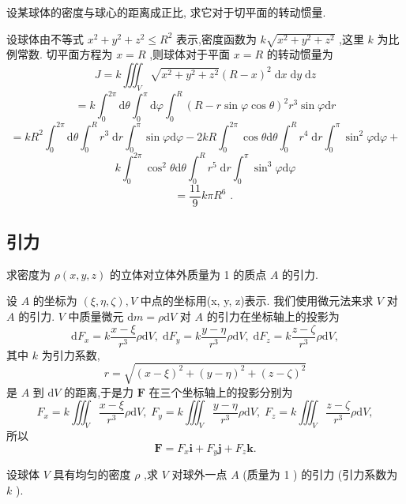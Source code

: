 \begin{example}

\end{example}
设某球体的密度与球心的距离成正比, 求它对于切平面的转动惯量.

\begin{solution}

\end{solution}
设球体由不等式 \({x}^{2} + {y}^{2} + {z}^{2} \leq  {R}^{2}\) 表示,密度函数为 \(k\sqrt{{x}^{2} + {y}^{2} + {z}^{2}}\) ,这里 \(k\) 为比例常数. 切平面方程为 \(x = R\) ,则球体对于平面 \(x = R\) 的转动惯量为
\[
J = k{\iiint }_{V}\sqrt{{x}^{2} + {y}^{2} + {z}^{2}}{\left( R - x\right) }^{2}\mathrm{\;d}x\mathrm{\;d}y\mathrm{\;d}z
\]
\[
= k{\int }_{0}^{2\pi }\mathrm{d}\theta {\int }_{0}^{\pi }\mathrm{d}\varphi {\int }_{0}^{R}{\left( R - r\sin \varphi \cos \theta \right) }^{2}{r}^{3}\sin \varphi \mathrm{d}r
\]
\[
= k{R}^{2}{\int }_{0}^{2\pi }\mathrm{d}\theta {\int }_{0}^{R}{r}^{3}\mathrm{\;d}r{\int }_{0}^{\pi }\sin \varphi \mathrm{d}\varphi  - {2kR}{\int }_{0}^{2\pi }\cos \theta \mathrm{d}\theta {\int }_{0}^{R}{r}^{4}\mathrm{\;d}r{\int }_{0}^{\pi }{\sin }^{2}\varphi \mathrm{d}\varphi  +
\]
\[
k{\int }_{0}^{2\pi }{\cos }^{2}\theta \mathrm{d}\theta {\int }_{0}^{R}{r}^{5}\mathrm{\;d}r{\int }_{0}^{\pi }{\sin }^{3}\varphi \mathrm{d}\varphi
\]
\[
= \frac{11}{9}{k\pi }{R}^{6}\text{ . }
\]


\subsection{引力}

求密度为 \(\rho \left( {x,y,z}\right)\) 的立体对立体外质量为 1 的质点 \(A\) 的引力.

设 \(A\) 的坐标为 \(\left( {\xi ,\eta ,\zeta }\right) ,V\) 中点的坐标用(x, y, z)表示. 我们使用微元法来求 \(V\) 对 \(A\) 的引力. \(V\) 中质量微元 \(\mathrm{d}m = \rho \mathrm{d}V\) 对 \(A\) 的引力在坐标轴上的投影为
\[
\mathrm{d}{F}_{x} = k\frac{x - \xi }{{r}^{3}}\rho \mathrm{d}V,\mathrm{\;d}{F}_{y} = k\frac{y - \eta }{{r}^{3}}\rho \mathrm{d}V,\mathrm{\;d}{F}_{z} = k\frac{z - \zeta }{{r}^{3}}\rho \mathrm{d}V,
\]
其中 \(k\) 为引力系数,
\[
r = \sqrt{{\left( x - \xi \right) }^{2} + {\left( y - \eta \right) }^{2} + {\left( z - \zeta \right) }^{2}}
\]
是 \(A\) 到 \(\mathrm{d}V\) 的距离,于是力 \(\mathbf{F}\) 在三个坐标轴上的投影分别为
\[
{F}_{x} = k{\iiint }_{V}\frac{x - \xi }{{r}^{3}}\rho \mathrm{d}V,\;{F}_{y} = k{\iiint }_{V}\frac{y - \eta }{{r}^{3}}\rho \mathrm{d}V,\;{F}_{z} = k{\iiint }_{V}\frac{z - \zeta }{{r}^{3}}\rho \mathrm{d}V,
\]
所以
\[
\mathbf{F} = {F}_{x}\mathbf{i} + {F}_{y}\mathbf{j} + {F}_{z}\mathbf{k}.
\]
\begin{example}

\end{example}
设球体 \(V\) 具有均匀的密度 \(\rho\) ,求 \(V\) 对球外一点 \(A\) (质量为 1 ) 的引力 (引力系数为 \(k\) ).

